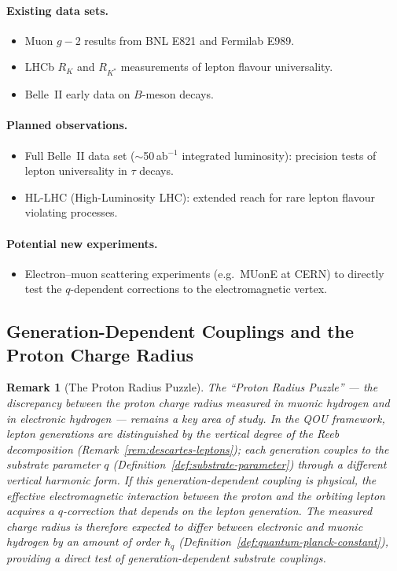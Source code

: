 \documentclass[12pt,a4paper]{report}
\newtheorem{remark}[theorem]{Remark}
\begin{document}
\paragraph{Existing data sets.}
\begin{itemize}
  \item Muon $g-2$ results from BNL E821 and Fermilab E989.
  \item LHCb $R_K$ and $R_{K^*}$ measurements of lepton flavour
        universality.
  \item Belle~II early data on $B$-meson decays.
\end{itemize}

\paragraph{Planned observations.}
\begin{itemize}
  \item Full Belle~II data set ($\sim$50\,ab$^{-1}$ integrated luminosity):
        precision tests of
        lepton universality in $\tau$ decays.
  \item HL-LHC (High-Luminosity LHC): extended reach for rare lepton
        flavour violating processes.
\end{itemize}

\paragraph{Potential new experiments.}
\begin{itemize}
  \item Electron--muon scattering experiments (e.g.\ MUonE at CERN) to
        directly test the $q$-dependent corrections to the electromagnetic
        vertex.
\end{itemize}

\subsection{Generation-Dependent Couplings and the Proton Charge Radius}
\label{ssec:proton-radius}

\begin{remark}[The Proton Radius Puzzle]
\label{rem:proton-radius-puzzle}
The ``Proton Radius Puzzle'' --- the discrepancy between the proton charge
radius measured in muonic hydrogen and in electronic hydrogen --- remains a
key area of study.  In the QOU framework, lepton generations are distinguished
by the vertical degree of the Reeb decomposition
(Remark~\ref{rem:descartes-leptons}); each generation couples to the substrate
parameter $q$ (Definition~\ref{def:substrate-parameter}) through a different
vertical harmonic form.  If this generation-dependent coupling is physical, the
effective electromagnetic interaction between the proton and the orbiting lepton
acquires a $q$-correction that depends on the lepton generation.  The measured
charge radius is therefore expected to differ between electronic and muonic
hydrogen by an amount of order $\hbar_q$
(Definition~\ref{def:quantum-planck-constant}), providing a direct test of
generation-dependent substrate couplings.
\end{remark}
\end{document}

